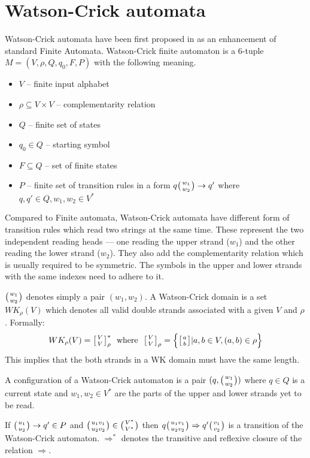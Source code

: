 \section{Watson-Crick automata} \label{section:WKA}
Watson-Crick automata have been first proposed in \cite{WK_FIN_AUT} as an enhancement of standard Finite Automata. Watson-Crick finite automaton is a 6-tuple $M = (V, \rho, Q, q_0, F, P)$ with the following meaning.
\begin{itemize}
  \item{$V$ -- finite input alphabet}
  \item{$\rho \subseteq V \times V$ -- complementarity relation}
  \item{$Q$ -- finite set of states}
  \item{$q_0 \in Q$ -- starting symbol}
  \item{$F \subseteq Q$ -- set of finite states}
  \item{$P$ -- finite set of transition rules in a form $q \wkpair{w_1}{w_2} \rightarrow q'$ where $q, q' \in Q, w_1, w_2 \in V^*$}
\end{itemize}

Compared to Finite automata, Watson-Crick automata have different form of transition rules which read two strings at the same time. These represent the two independent reading heads --- one reading the upper strand ($w_1$) and the other reading the lower strand ($w_2$). They also add the complementarity relation which is usually required to be symmetric. The symbols in the upper and lower strands with the same indexes need to adhere to it.

$\wkpair{w_1}{w_2}$ denotes simply a pair $(w_1, w_2)$.
A Watson-Crick domain is a set $WK_{\rho}(V)$ which denotes all valid double strands associated with a given $V$ and $\rho$. Formally:
$$WK_{\rho}(V) = \wkdomain{V}{V}_{\rho}^{*} \:\:\: \textnormal{where} \:\:\: \wkdomain{V}{V}_{\rho} = \Big\{\wkdomain{a}{b} | a, b \in V, (a, b) \in \rho \Big\}$$
This implies that the both strands in a WK domain must have the same length.

A configuration of a Watson-Crick automaton is a pair $(q, \wkpair{w_1}{w_2})$ where $q \in Q$ is a current state and $w_1, w_2 \in V^*$ are the parts of the upper and lower strands yet to be read.

If $\wkpair{u_1}{u_2} \rightarrow q' \in P$ and $\wkpair{u_1 v_1}{u_2 v_2} \in \wkpair{V^*}{V^*}$ then $q \wkpair{u_1 v_1}{u_2 v_2} \Rightarrow q' \wkpair{v_1}{v_2}$ is a transition of the Watson-Crick automaton. $\Rightarrow^*$ denotes the transitive and reflexive closure of the relation $\Rightarrow$.

